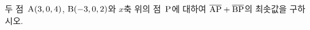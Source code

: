 두 점~$\mathrm{A}(3{,}\mkern3mu\mathopen{}0{,}\mkern3mu\mathopen{}4)$, $\mathrm{B}(-3{,}\mkern3mu\mathopen{}0{,}\mkern3mu\mathopen{}2)$와 $x$축 위의 점~$\mathrm{P}$에 대하여 $\overline{\mathrm{AP}}+\overline{\mathrm{BP}}$의 최솟값을 구하시오.
